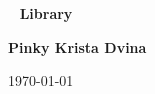 \begin{titlepage}
    \centering
    ~
    \vfill
    {\Huge\bfseries\sffamily Library} \bigskip\par
    {\Large\bfseries Pinky Krista Dvina} \bigskip\par
    \vfill
    \today
\end{titlepage}